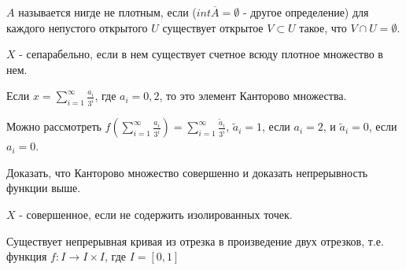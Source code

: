 \begin{definition}
    $A$ называется нигде не плотным, если ($int \overline{A} = \emptyset$ - другое определение) для каждого непустого открытого $U$ существует открытое $V \subset U$ такое, что $V \cap U = \emptyset$.
\end{definition}

\begin{definition}
    $X$ - сепарабельно, если в нем существует счетное всюду плотное множество в нем.
\end{definition}

\begin{example}
    Если $x = \sum_{i = 1}^{\infty} \frac{a_i}{3^i}$, где $a_i = 0, 2$, то это элемент Канторово множества.

    Можно рассмотреть $f(\sum_{i = 1}^{\infty} \frac{a_i}{3^i}) = \sum_{i = 1}^{\infty} \frac{\widetilde{a}_i}{3^i}$, $\widetilde{a}_i = 1$, если $a_i = 2$, и $\widetilde{a}_i = 0$, если $a_i = 0$.
\end{example}

\begin{exercise}
    Доказать, что Канторово множество совершенно и доказать непрерывность функции выше.
\end{exercise}

\begin{definition}
    $X$ - совершенное, если не содержить изолированных точек.
\end{definition}

\begin{theorem}
    Существует непрерывная кривая из отрезка в произведение двух отрезков, т.е. функция $f: I \rightarrow I \times I$, где $I = [0, 1]$
\end{theorem}